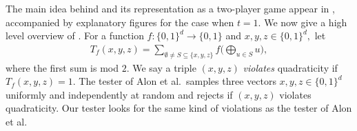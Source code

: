 \documentclass[11pt]{article}
\numberwithin{equation}{section}
\theoremstyle{definition}
\theoremstyle{plain}
\begin{document}
%
The main idea behind  and its representation as a two-player game appear in , accompanied by explanatory figures for the case when $t=1$. 
We now give a high level overview of .
For a function $f \colon \{0,1\}^d \to \{0,1\}$ and $x,y,z \in \{0,1\}^d,$ let 
\begin{align*}
T_f(x, y, z) = \sum_{\emptyset \neq S \subseteq \{x,y,z\}} f\bigl( \bigoplus_{u\in S} u \bigr), 
\end{align*}
where the first sum is mod $2$. We say a triple $(x, y, z)$ \emph{violates} quadraticity if $T_f(x,y,z) = 1$. 
The tester of Alon et al.~samples three vectors $x,y,z \in \{0,1\}^d$ uniformly and independently at random and rejects if $(x,y,z)$ violates quadraticity. Our tester looks for the same kind of violations as the tester of Alon et al.
\end{document}
